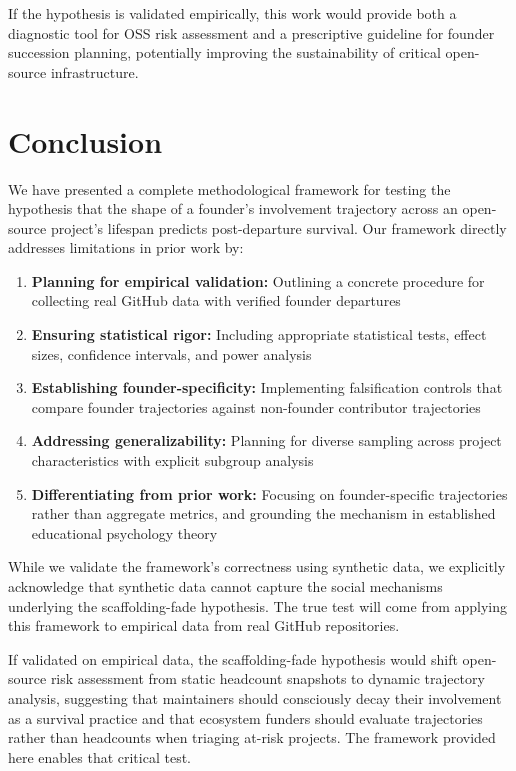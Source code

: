 \documentclass[11pt,letterpaper]{article}
\begin{document}
If the hypothesis is validated empirically, this work would provide both a diagnostic tool for OSS risk assessment and a prescriptive guideline for founder succession planning, potentially improving the sustainability of critical open-source infrastructure.

\section{Conclusion}
\label{sec:conclusion}

We have presented a complete methodological framework for testing the hypothesis that the shape of a founder's involvement trajectory across an open-source project's lifespan predicts post-departure survival. Our framework directly addresses limitations in prior work by:

\begin{enumerate}
  \item \textbf{Planning for empirical validation:} Outlining a concrete procedure for collecting real GitHub data with verified founder departures
  \item \textbf{Ensuring statistical rigor:} Including appropriate statistical tests, effect sizes, confidence intervals, and power analysis
  \item \textbf{Establishing founder-specificity:} Implementing falsification controls that compare founder trajectories against non-founder contributor trajectories
  \item \textbf{Addressing generalizability:} Planning for diverse sampling across project characteristics with explicit subgroup analysis
  \item \textbf{Differentiating from prior work:} Focusing on founder-specific trajectories rather than aggregate metrics, and grounding the mechanism in established educational psychology theory
\end{enumerate}

While we validate the framework's correctness using synthetic data, we explicitly acknowledge that synthetic data cannot capture the social mechanisms underlying the scaffolding-fade hypothesis. The true test will come from applying this framework to empirical data from real GitHub repositories.

If validated on empirical data, the scaffolding-fade hypothesis would shift open-source risk assessment from static headcount snapshots to dynamic trajectory analysis, suggesting that maintainers should consciously decay their involvement as a survival practice and that ecosystem funders should evaluate trajectories rather than headcounts when triaging at-risk projects. The framework provided here enables that critical test.



\end{document}
